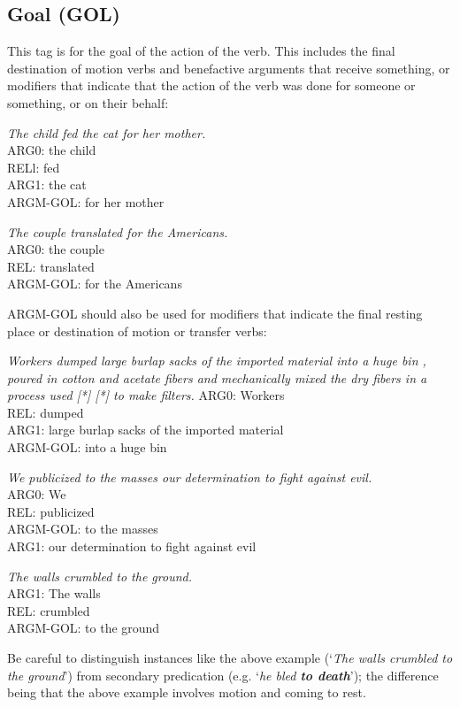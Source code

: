 \documentclass[11pt]{report}
\begin{document}
\subsection{Goal (GOL)}
\label{ssec: GOL}

This tag is for the goal of the action of the verb.  This includes the final destination of motion verbs and benefactive arguments that receive something, or modifiers that indicate that the action of the verb was done for someone or something, or on their behalf: 

\textit {The child fed the cat for her mother.}\\
ARG0: the child\\
RELl: fed\\
ARG1: the cat\\
ARGM-GOL: for her mother

\textit{The couple translated for the Americans.}\\
ARG0: the couple\\
REL: translated\\
ARGM-GOL: for the Americans

ARGM-GOL should also be used for modifiers that indicate the final resting place or destination of motion or transfer verbs:

\textit{Workers dumped large burlap sacks of the imported material into a huge bin , poured in cotton and acetate fibers and mechanically mixed the dry fibers in a process used [*] [*] to make filters.}
ARG0: Workers \\
REL: dumped \\
ARG1: large burlap sacks of the imported material \\
ARGM-GOL: into a huge bin

\textit{We publicized to the masses our determination to fight against evil.}\\
ARG0: We\\
REL: publicized\\
ARGM-GOL: to the masses\\
ARG1: our determination to fight against evil

\textit{The walls crumbled to the ground.}\\
ARG1: The walls\\
REL: crumbled \\
ARGM-GOL: to the ground

\noindent Be careful to distinguish instances like the above example (`\textit{The walls crumbled to the ground}') from secondary predication (e.g. `\textit{he bled \textbf{to death}}'); the difference being that the above example involves motion and coming to rest.  
\end{document}
